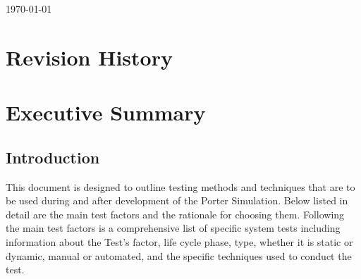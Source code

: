 \documentclass[paper=letter, fontsize=10pt]{scrartcl}
\numberwithin{equation}{section}		%
\numberwithin{figure}{section}			%
\numberwithin{table}{section}				%
\begin{document}
\begin{titlepage}
\begin{center}


{\large \today}\\[3cm] %


 

\vfill %
\end{center}
\end{titlepage}

\setcounter{tocdepth}{2}

\tableofcontents

\newpage

\section{Revision History}

\section{Executive Summary}
\subsection{Introduction}
This document is designed to outline testing methods and techniques that are to be used during and after development
of the Porter Simulation. Below listed in detail are the main test factors and the rationale for choosing them. 
Following the main test factors is a comprehensive list of specific system tests including information about the Test's factor, life cycle phase, type, whether it is static or dynamic, manual or automated, and the specific techniques used to
conduct the test.
\end{document}
